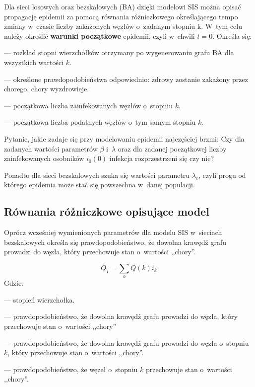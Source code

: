 Dla sieci losowych oraz bezskalowych (BA) dzięki modelowi SIS można opisać propagację epidemii za pomocą równania różniczkowego określającego tempo zmiany w~czasie liczby zakażonych węzłów o~zadanym stopniu k. W~tym celu należy określić \textbf{warunki początkowe} epidemii, czyli w~chwili $t = 0$. Określa się:
\begin{description} \itemsep0pt
\item[P(k)] --- rozkład stopni wierzchołków otrzymany po wygenerowaniu grafu BA dla wszystkich wartości $k$.
\item[$\pmb{\beta, \gamma}$] --- określone prawdopodobieństwa odpowiednio: zdrowy zostanie zakażony przez chorego, chory wyzdrowieje.
\item[$\pmb{I_k(0)}$] --- początkowa liczba zainfekowanych węzłów o~stopniu $k$.
\item[$\pmb{S_k(0)}$] --- początkowa liczba podatnych węzłów o~tym samym stopniu $k$.
\end{description}

Pytanie, jakie zadaje się przy modelowaniu epidemii najczęściej brzmi: Czy dla zadanych wartości parametrów $\beta$ i~$\lambda$ oraz dla zadanej początkowej liczby zainfekowanych osobników $i_0(0)$ infekcja rozprzestrzeni się czy nie?

Ponadto dla sieci bezskalowych szuka się wartości parametru $\lambda_c$, czyli progu od którego epidemia może stać się powszechna w~danej populacji.

\subsection{Równania różniczkowe opisujące model}
\label{subsec:rownania_rozniczkowe_opisujace_model}

Oprócz wcześniej wymienionych parametrów dla modelu SIS w~sieciach bezskalowych określa się prawdopodobieństwo, że dowolna krawędź grafu prowadzi do węzła, który przechowuje stan o~wartości ,,chory''.

\begin{equation}
\label{eq:q_i}
Q_I = \sum_{k} Q(k) i_k
\end{equation}
Gdzie:
\begin{description} \itemsep0pt
\item[k] --- stopień wierzchołka.
\item[$\pmb{Q_I}$] --- prawdopodobieństwo, że dowolna krawędź grafu prowadzi do węzła, który przechowuje stan o~wartości ,,chory''
\item[$\pmb{Q(k)}$] --- prawdopodobieństwo, że dowolna krawędź grafu prowadzi do węzła o~stopniu $k$, który przechowuje stan o~wartości ,,chory''.
\item[$\pmb{i_k}$] --- prawdopodobieństwo, że węzeł o~stopniu $k$ przechowuje stan o~wartości ,,chory''.
\end{description}

